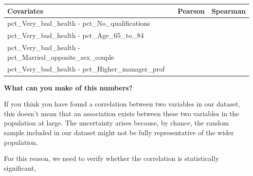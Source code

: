 \documentclass[
  letterpaper,
  DIV=11,
  numbers=noendperiod]{scrreprt}
\newenvironment{Shaded}{\begin{snugshade}}{\end{snugshade}}
\newcommand{\AttributeTok}[1]{\textcolor[rgb]{0.40,0.45,0.13}{#1}}
\newcommand{\CommentTok}[1]{\textcolor[rgb]{0.37,0.37,0.37}{#1}}
\newcommand{\FunctionTok}[1]{\textcolor[rgb]{0.28,0.35,0.67}{#1}}
\newcommand{\NormalTok}[1]{\textcolor[rgb]{0.00,0.23,0.31}{#1}}
\newcommand{\OtherTok}[1]{\textcolor[rgb]{0.00,0.23,0.31}{#1}}
\newcommand{\SpecialCharTok}[1]{\textcolor[rgb]{0.37,0.37,0.37}{#1}}
\newcommand{\StringTok}[1]{\textcolor[rgb]{0.13,0.47,0.30}{#1}}
\begin{document}
\begin{longtable}[]{@{}
  >{\raggedright\arraybackslash}p{}
  >{\raggedright\arraybackslash}p{}
  >{\raggedright\arraybackslash}p{}@{}}
\toprule\noalign{}
\begin{minipage}[b]{\linewidth}\raggedright
Covariates
\end{minipage} & \begin{minipage}[b]{\linewidth}\raggedright
Pearson
\end{minipage} & \begin{minipage}[b]{\linewidth}\raggedright
Spearman
\end{minipage} \\
\midrule\noalign{}
\endhead
\bottomrule\noalign{}
\endlastfoot
pct\_Very\_bad\_health - pct\_No\_qualifications & & \\
pct\_Very\_bad\_health - pct\_Age\_65\_to\_84 & & \\
pct\_Very\_bad\_health - pct\_Married\_opposite\_sex\_couple & & \\
pct\_Very\_bad\_health - pct\_Higher\_manager\_prof & & \\
\end{longtable}

\textbf{What can you make of this numbers?}

If you think you have found a correlation between two variables in our
dataset, this doesn't mean that an association exists between these two
variables in the population at large. The uncertainty arises because, by
chance, the random sample included in our dataset might not be fully
representative of the wider population.

For this reason, we need to verify whether the correlation is
statistically significant,

\begin{Shaded}
\end{Shaded}
\end{document}
